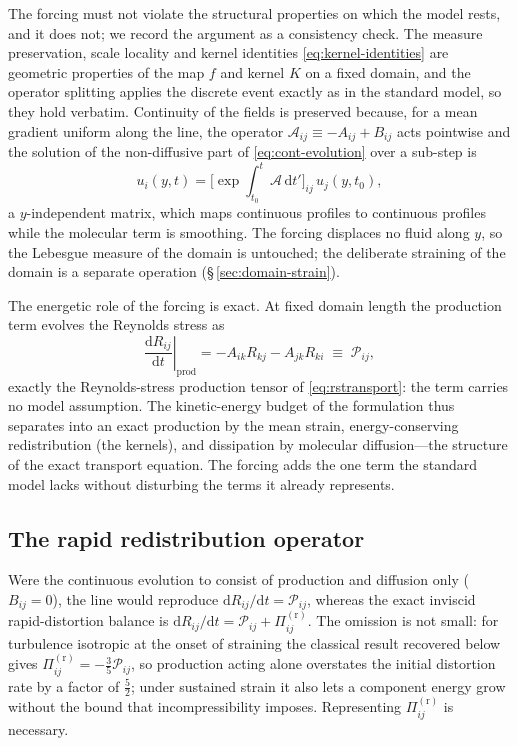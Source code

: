 \documentclass[lineno]{JFM-FLM_Au}
\begin{document}
The forcing must not violate the structural properties on which the
model rests, and it does not; we record the argument as a consistency
check. The measure preservation, scale locality and kernel identities
\eqref{eq:kernel-identities} are geometric properties of the map $f$ and
kernel $K$ on a fixed domain, and the operator splitting applies the
discrete event exactly as in the standard model, so they hold verbatim.
Continuity of the fields is preserved because, for a mean gradient
uniform along the line, the operator
$\mathcal{A}_{ij}\equiv-A_{ij}+B_{ij}$ acts pointwise and the solution of
the non-diffusive part of \eqref{eq:cont-evolution} over a sub-step is
\begin{equation}
  u_i(y,t)=\big[\exp\!\textstyle\int_{t_0}^{t}
           \mathcal{A}\,\mathrm{d}t'\big]_{ij}\,u_j(y,t_0),
  \label{eq:matrixexp}
\end{equation}
a $y$-independent matrix, which maps continuous profiles to continuous
profiles while the molecular term is smoothing. The forcing displaces no
fluid along $y$, so the Lebesgue measure of the domain is untouched; the
deliberate straining of the domain is a separate operation
(\S\,\ref{sec:domain-strain}).

The energetic role of the forcing is exact. At fixed domain length the
production term evolves the Reynolds stress as
\begin{equation}
  \left.\frac{\mathrm{d}R_{ij}}{\mathrm{d}t}\right|_{\text{prod}}
  = -A_{ik}R_{kj}-A_{jk}R_{ki}
  \;\equiv\; \mathcal{P}_{ij},
  \label{eq:production-rate}
\end{equation}
exactly the Reynolds-stress production tensor of \eqref{eq:rstransport}:
the term carries no model assumption. The kinetic-energy budget of the
formulation thus separates into an exact production by the mean strain,
energy-conserving redistribution (the kernels), and dissipation by
molecular diffusion---the structure of the exact transport equation. The
forcing adds the one term the standard model lacks without disturbing the
terms it already represents.

\subsection{The rapid redistribution operator}\label{sec:rapid-kernel}

Were the continuous evolution to consist of production and diffusion only
($B_{ij}=0$), the line would reproduce
$\mathrm{d}R_{ij}/\mathrm{d}t=\mathcal{P}_{ij}$, whereas the exact
inviscid rapid-distortion balance is
$\mathrm{d}R_{ij}/\mathrm{d}t=\mathcal{P}_{ij}+\Pi^{(\mathrm r)}_{ij}$.
The omission is not small: for turbulence isotropic at the onset of
straining the classical result recovered below gives
$\Pi^{(\mathrm r)}_{ij}=-\tfrac35\mathcal{P}_{ij}$, so production acting
alone overstates the initial distortion rate by a factor of $\tfrac52$;
under sustained strain it also lets a component energy grow without the
bound that incompressibility imposes. Representing
$\Pi^{(\mathrm r)}_{ij}$ is necessary.
\end{document}
